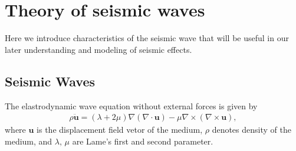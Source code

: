 \section{Theory of seismic waves} \label{sec:31}
Here we introduce characteristics of the seismic wave that will be useful in our later understanding and modeling of seismic effects.



\subsection{Seismic Waves}
The elastrodynamic wave equation without external forces is given by 
\begin{eqnarray}\label{eq:eq_1}
  \rho{\bm{\ddot{u}}} = (\lambda+2\mu)\nabla(\nabla\cdot\bm{u}) - \mu\nabla\times(\nabla\times\bm{u}),
\end{eqnarray}
where $\bm{u}$ is the displacement field vetor of the medium, $\rho$ denotes density of the medium, and $\lambda,\,\mu$ are Lame's first and second parameter.



